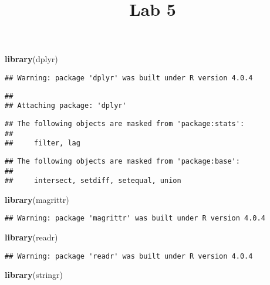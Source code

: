 \documentclass[
]{article}
\title{Lab 5}
\author{}
\date{\vspace{-2.5em}}
\newenvironment{Shaded}{\begin{snugshade}}{\end{snugshade}}
\newcommand{\KeywordTok}[1]{\textcolor[rgb]{0.13,0.29,0.53}{\textbf{#1}}}
\newcommand{\NormalTok}[1]{#1}
\begin{document}
\maketitle

\begin{Shaded}
\begin{Highlighting}[]
\KeywordTok{library}\NormalTok{(dplyr)}
\end{Highlighting}
\end{Shaded}

\begin{verbatim}
## Warning: package 'dplyr' was built under R version 4.0.4
\end{verbatim}

\begin{verbatim}
## 
## Attaching package: 'dplyr'
\end{verbatim}

\begin{verbatim}
## The following objects are masked from 'package:stats':
## 
##     filter, lag
\end{verbatim}

\begin{verbatim}
## The following objects are masked from 'package:base':
## 
##     intersect, setdiff, setequal, union
\end{verbatim}

\begin{Shaded}
\begin{Highlighting}[]
\KeywordTok{library}\NormalTok{(magrittr)}
\end{Highlighting}
\end{Shaded}

\begin{verbatim}
## Warning: package 'magrittr' was built under R version 4.0.4
\end{verbatim}

\begin{Shaded}
\begin{Highlighting}[]
\KeywordTok{library}\NormalTok{(readr)}
\end{Highlighting}
\end{Shaded}

\begin{verbatim}
## Warning: package 'readr' was built under R version 4.0.4
\end{verbatim}

\begin{Shaded}
\begin{Highlighting}[]
\KeywordTok{library}\NormalTok{(stringr)}
\end{Highlighting}
\end{Shaded}
\end{document}
